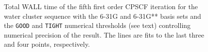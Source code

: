 \documentclass[prl,aps,twocolumn,showpacs,twocolumngrid,superbib]{revtex4}
\begin{document}
\begin{figure}[t]
  \caption{\protect
    Total WALL time of the fifth first order CPSCF iteration for
    the water cluster sequence with the 6-31G and 6-31G** 
    basis sets and the {\tt GOOD} and {\tt TIGHT} 
    numerical thresholds (see text) controlling numerical
    precision of the result. The lines are fits to the 
    last three and four points, respectively.
  }\label{Alpha_scaling}
\end{figure}
\end{document}
